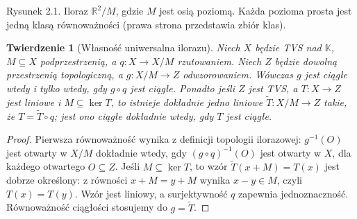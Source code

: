 \documentclass[11pt,a4paper]{article}
\numberwithin{equation}{section}
\theoremstyle{plain}
\newtheorem{twierdzenie}{Twierdzenie}[section]
\theoremstyle{definition}
\theoremstyle{remark}
\newcommand{\R}{\mathbb R}
\newcommand{\K}{\mathbb K}
\begin{document}
\begin{center}

{\small Rysunek 2.1. Iloraz $\R^2/M$, gdzie $M$ jest osią poziomą.
Każda pozioma prosta jest jedną klasą równoważności
(prawa strona przedstawia zbiór klas).}
\end{center}

\begin{twierdzenie}[Własność uniwersalna ilorazu]\label{thm:quotient-universal}
Niech $X$ będzie TVS nad $\K$, $M\subseteq X$ podprzestrzenią,
a $q:X\to X/M$ rzutowaniem. Niech $Z$ będzie dowolną
przestrzenią topologiczną, a $g:X/M\to Z$ odwzorowaniem.
Wówczas $g$ jest ciągłe wtedy i tylko wtedy,
gdy $g\circ q$ jest ciągłe. Ponadto jeśli $Z$ jest TVS,
a $T:X\to Z$ jest liniowe i $M\subseteq\ker T$, to
istnieje dokładnie jedno liniowe $\widetilde T:X/M\to Z$
takie, że $T=\widetilde T\circ q$; jest ono ciągłe
dokładnie wtedy, gdy $T$ jest ciągłe.
\end{twierdzenie}
\begin{proof}
Pierwsza równoważność wynika z definicji topologii ilorazowej:
$g^{-1}(O)$ jest otwarty w $X/M$ dokładnie wtedy,
gdy $(g\circ q)^{-1}(O)$ jest otwarty w $X$, dla każdego
otwartego $O\subseteq Z$. Jeśli $M\subseteq\ker T$,
to wzór $\widetilde T(x+M)=T(x)$ jest dobrze określony:
z równości $x+M=y+M$ wynika $x-y\in M$, czyli $T(x)=T(y)$.
Wzór jest liniowy, a surjektywność $q$ zapewnia jednoznaczność.
Równoważność ciągłości stosujemy do $g=\widetilde T$.
\end{proof}
\end{document}
